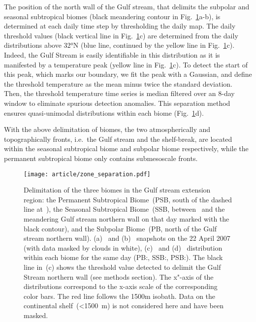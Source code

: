 The position of the north wall of the Gulf stream, that delimits the subpolar and seasonal subtropical biomes (black meandering contour in Fig.~\ref{fig:zone-separation}a-b), is determined at each daily time step by thresholding the daily  map.
The daily threshold values (black vertical line in Fig.~\ref{fig:zone-separation}c) are determined from the daily  distributions above 32°N (blue line, continued by the yellow line in Fig.~\ref{fig:zone-separation}c).
Indeed, the Gulf Stream is easily identifiable in this distribution as it is manifested by a temperature peak (yellow line in Fig.~\ref{fig:zone-separation}c).
To detect the start of this peak, which marks our boundary, we fit the peak with a Gaussian, and define the threshold temperature as the mean minus twice the standard deviation.
Then, the threshold temperature time series is median filtered over an 8-day window to eliminate spurious detection anomalies.
This separation method ensures quasi-unimodal  distributions within each biome (Fig.~\ref{fig:zone-separation}d).

With the above delimitation of biomes, the two atmospherically and topographically fronts, i.e.\ the Gulf stream and the shelf-break, are located within the seasonal subtropical biome and subpolar biome respectively, while the permanent subtropical biome only contains submesoscale fronts.

\begin{figure}
  \centering
  \texttt{[image: article/zone\_separation.pdf]}
  \caption[Delimitation of biomes]{
    Delimitation of the three biomes in the Gulf stream extension region: the Permanent Subtropical Biome~(PSB, south of the dashed line at~), the Seasonal Subtropical Biome~(SSB, between~ and the meandering Gulf stream northern wall on that day marked with the black contour), and the Subpolar Biome~(PB, north of the Gulf stream northern wall).
    (a)~ and (b)~ snapshots on the 22 April 2007 (with data masked by clouds in white), (c)~ and (d)~  distribution within each biome for the same day (PB:\@blue, SSB:\@yellow, PSB:\@red).
    The black line in~(c) shows the  threshold value detected to delimit the Gulf Stream northern wall (see methods section).
    The x"-axis of the distributions correspond to the x-axis scale of the corresponding color bars.
    The red line follows the 1500m isobath.
    Data on the continental shelf~(\qty{<1500}{\m}) is not considered here and have been masked.
  }%
  \label{fig:zone-separation}
\end{figure}


